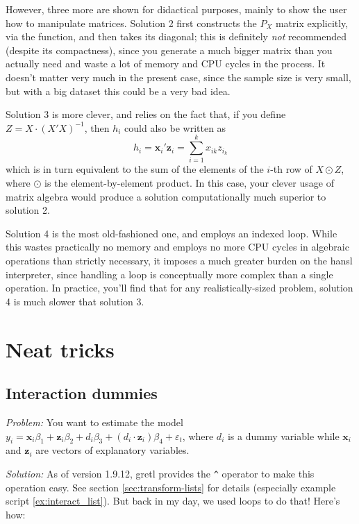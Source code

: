 However, three more are shown for didactical purposes, mainly to show
the user how to manipulate matrices. Solution 2 first constructs the
$P_X$ matrix explicitly, via the  function, and then takes
its diagonal; this is definitely \emph{not} recommended (despite its
compactness), since you generate a much bigger matrix than you
actually need and waste a lot of memory and CPU cycles in the
process. It doesn't matter very much in the present case, since the
sample size is very small, but with a big dataset this could be a very
bad idea.

Solution 3 is more clever, and relies on the fact that, if you
define $Z = X\cdot(X'X)^{-1}$, then $h_i$ could also
be written as
\[
 h_i = \mathbf{x}_i' \mathbf{z}_i = \sum_{i=1}^k x_{ik} z_{i_k} 
\]
which is in turn equivalent to the sum of the elements of the $i$-th
row of $X \odot Z$, where $\odot$ is the element-by-element
product. In this case, your clever usage of matrix algebra would
produce a solution computationally much superior to solution 2.

Solution 4 is the most old-fashioned one, and employs an indexed
loop. While this wastes practically no memory and employs no more CPU
cycles in algebraic operations than strictly necessary, it imposes a
much greater burden on the hansl interpreter, since handling a loop is
conceptually more complex than a single operation. In practice, you'll
find that for any realistically-sized problem, solution 4 is much
slower that solution 3.

\section{Neat tricks}
\label{sec:cheat-neat}

\subsection{Interaction dummies}

\emph{Problem:} You want to estimate the model $y_i = \mathbf{x}_i
\beta_1 + \mathbf{z}_i \beta_2 + d_i \beta_3 + (d_i \cdot \mathbf{z}_i)
\beta_4 + \varepsilon_t$, where $d_i$ is a dummy variable while
$\mathbf{x}_i$ and $\mathbf{z}_i$ are vectors of explanatory
variables.

\emph{Solution:} As of version 1.9.12, gretl provides the
\verb|^| operator to make this operation easy. See section
\ref{sec:transform-lists} for details (especially example script
\ref{ex:interact_list}). But back in my day, we used loops to do that!
Here's how:

